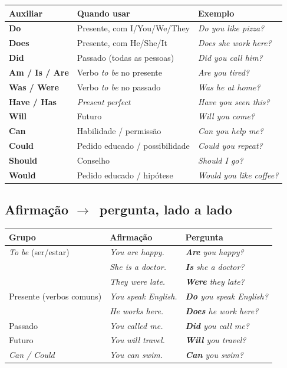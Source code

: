 \documentclass[12pt,a4paper,oneside]{book}
\newcommand{\en}[1]{\textit{#1}}                 %
\newcommand{\aux}[1]{\textbf{\textcolor{blue!60!black}{#1}}} %
\newcommand{\ra}{$\rightarrow$}
\begin{document}
\begin{center}
\begin{tabularx}{\textwidth}{@{}lXl@{}}
\toprule
\textbf{Auxiliar} & \textbf{Quando usar} & \textbf{Exemplo} \\
\midrule
\aux{Do}\index{do/does/did} & Presente, com I/You/We/They & \en{Do you like pizza?} \\
\aux{Does} & Presente, com He/She/It & \en{Does she work here?} \\
\aux{Did} & Passado (todas as pessoas) & \en{Did you call him?} \\
\aux{Am / Is / Are}\index{verbo to be} & Verbo \en{to be} no presente & \en{Are you tired?} \\
\aux{Was / Were} & Verbo \en{to be} no passado & \en{Was he at home?} \\
\aux{Have / Has}\index{present perfect} & \en{Present perfect} & \en{Have you seen this?} \\
\aux{Will} & Futuro & \en{Will you come?} \\
\aux{Can}\index{modal verb} & Habilidade / permissão & \en{Can you help me?} \\
\aux{Could} & Pedido educado / possibilidade & \en{Could you repeat?} \\
\aux{Should} & Conselho & \en{Should I go?} \\
\aux{Would} & Pedido educado / hipótese & \en{Would you like coffee?} \\
\bottomrule
\end{tabularx}
\end{center}

\subsection{Afirmação \ra\ pergunta, lado a lado}

\begin{center}
\begin{tabularx}{\textwidth}{@{}lXX@{}}
\toprule
\textbf{Grupo} & \textbf{Afirmação} & \textbf{Pergunta} \\
\midrule
\en{To be} (ser/estar) & \en{You are happy.} & \en{\aux{Are} you happy?} \\
 & \en{She is a doctor.} & \en{\aux{Is} she a doctor?} \\
 & \en{They were late.} & \en{\aux{Were} they late?} \\
\midrule
Presente (verbos comuns) & \en{You speak English.} & \en{\aux{Do} you speak English?} \\
 & \en{He works here.} & \en{\aux{Does} he work here?} \\
\midrule
Passado & \en{You called me.} & \en{\aux{Did} you call me?} \\
\midrule
Futuro & \en{You will travel.} & \en{\aux{Will} you travel?} \\
\midrule
\en{Can / Could} & \en{You can swim.} & \en{\aux{Can} you swim?} \\
\bottomrule
\end{tabularx}
\end{center}
\end{document}
